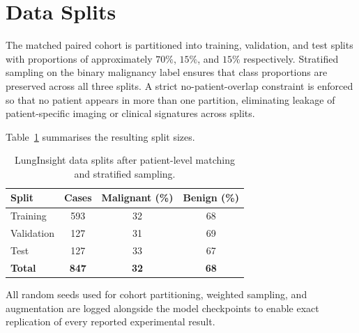 \section{Data Splits}
\label{sec:data-splits}

The matched paired cohort is partitioned into training, validation, and test
splits with proportions of approximately $70\%$, $15\%$, and $15\%$
respectively. Stratified sampling on the binary malignancy label ensures that
class proportions are preserved across all three splits. A strict
no-patient-overlap constraint is enforced so that no patient appears in more
than one partition, eliminating leakage of patient-specific imaging or
clinical signatures across splits.

Table~\ref{tab:appendix1-splits} summarises the resulting split sizes.

\begin{table}[H]
\centering
\caption{LungInsight data splits after patient-level matching and stratified
sampling.}
\label{tab:appendix1-splits}
\begin{tabular}{lccc}
\toprule
\textbf{Split} & \textbf{Cases} & \textbf{Malignant (\%)} & \textbf{Benign (\%)} \\
\midrule
Training   & 593 & 32 & 68 \\
Validation & 127 & 31 & 69 \\
Test       & 127 & 33 & 67 \\
\midrule
\textbf{Total} & \textbf{847} & \textbf{32} & \textbf{68} \\
\bottomrule
\end{tabular}
\end{table}

All random seeds used for cohort partitioning, weighted sampling, and
augmentation are logged alongside the model checkpoints to enable exact
replication of every reported experimental result.